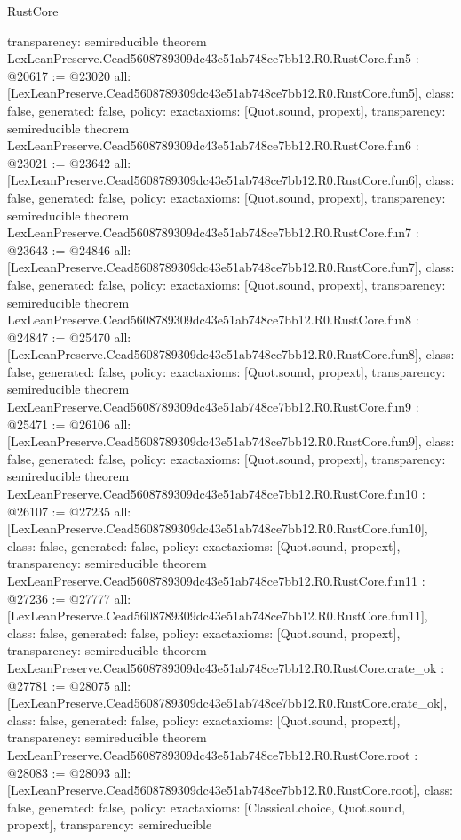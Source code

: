 \begin{lexlean}{RustCore}
\begin{coremodule}
{  transparency: semireducible
}
theorem LexLeanPreserve.Cead5608789309dc43e51ab748ce7bb12.R0.RustCore.fun5 : @20617 := @23020 {
  all: [LexLeanPreserve.Cead5608789309dc43e51ab748ce7bb12.R0.RustCore.fun5],
  class: false,
  generated: false,
  policy: exact{axioms: [Quot.sound, propext]},
  transparency: semireducible
}
theorem LexLeanPreserve.Cead5608789309dc43e51ab748ce7bb12.R0.RustCore.fun6 : @23021 := @23642 {
  all: [LexLeanPreserve.Cead5608789309dc43e51ab748ce7bb12.R0.RustCore.fun6],
  class: false,
  generated: false,
  policy: exact{axioms: [Quot.sound, propext]},
  transparency: semireducible
}
theorem LexLeanPreserve.Cead5608789309dc43e51ab748ce7bb12.R0.RustCore.fun7 : @23643 := @24846 {
  all: [LexLeanPreserve.Cead5608789309dc43e51ab748ce7bb12.R0.RustCore.fun7],
  class: false,
  generated: false,
  policy: exact{axioms: [Quot.sound, propext]},
  transparency: semireducible
}
theorem LexLeanPreserve.Cead5608789309dc43e51ab748ce7bb12.R0.RustCore.fun8 : @24847 := @25470 {
  all: [LexLeanPreserve.Cead5608789309dc43e51ab748ce7bb12.R0.RustCore.fun8],
  class: false,
  generated: false,
  policy: exact{axioms: [Quot.sound, propext]},
  transparency: semireducible
}
theorem LexLeanPreserve.Cead5608789309dc43e51ab748ce7bb12.R0.RustCore.fun9 : @25471 := @26106 {
  all: [LexLeanPreserve.Cead5608789309dc43e51ab748ce7bb12.R0.RustCore.fun9],
  class: false,
  generated: false,
  policy: exact{axioms: [Quot.sound, propext]},
  transparency: semireducible
}
theorem LexLeanPreserve.Cead5608789309dc43e51ab748ce7bb12.R0.RustCore.fun10 : @26107 := @27235 {
  all: [LexLeanPreserve.Cead5608789309dc43e51ab748ce7bb12.R0.RustCore.fun10],
  class: false,
  generated: false,
  policy: exact{axioms: [Quot.sound, propext]},
  transparency: semireducible
}
theorem LexLeanPreserve.Cead5608789309dc43e51ab748ce7bb12.R0.RustCore.fun11 : @27236 := @27777 {
  all: [LexLeanPreserve.Cead5608789309dc43e51ab748ce7bb12.R0.RustCore.fun11],
  class: false,
  generated: false,
  policy: exact{axioms: [Quot.sound, propext]},
  transparency: semireducible
}
theorem LexLeanPreserve.Cead5608789309dc43e51ab748ce7bb12.R0.RustCore.crate_ok : @27781 := @28075 {
  all: [LexLeanPreserve.Cead5608789309dc43e51ab748ce7bb12.R0.RustCore.crate_ok],
  class: false,
  generated: false,
  policy: exact{axioms: [Quot.sound, propext]},
  transparency: semireducible
}
theorem LexLeanPreserve.Cead5608789309dc43e51ab748ce7bb12.R0.RustCore.root : @28083 := @28093 {
  all: [LexLeanPreserve.Cead5608789309dc43e51ab748ce7bb12.R0.RustCore.root],
  class: false,
  generated: false,
  policy: exact{axioms: [Classical.choice, Quot.sound, propext]},
  transparency: semireducible
}


\end{coremodule}
\end{lexlean}
